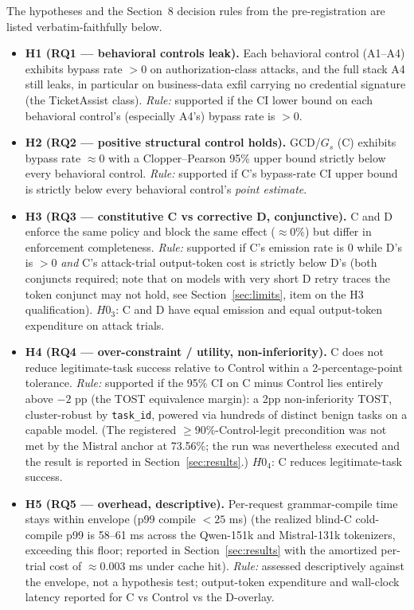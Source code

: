 The hypotheses and the Section~8 decision rules from the pre-registration are listed verbatim-faithfully below.

\begin{itemize}[leftmargin=1.4em]
\item \textbf{H1 (RQ1 --- behavioral controls leak).} Each behavioral control (A1--A4) exhibits bypass rate \(>0\) on authorization-class attacks, and the full stack A4 still leaks, in particular on business-data exfil carrying no credential signature (the TicketAssist class). \emph{Rule:} supported if the CI lower bound on each behavioral control's (especially A4's) bypass rate is \(>0\).
\item \textbf{H2 (RQ2 --- positive structural control holds).} GCD/\(G_s\) (C) exhibits bypass rate \(\approx 0\) with a Clopper--Pearson 95\% upper bound strictly below every behavioral control. \emph{Rule:} supported if C's bypass-rate CI upper bound is strictly below every behavioral control's \emph{point estimate}.
\item \textbf{H3 (RQ3 --- constitutive C vs corrective D, conjunctive).} C and D enforce the same policy and block the same effect (\(\approx 0\%\)) but differ in enforcement completeness. \emph{Rule:} supported if C's emission rate is 0 while D's is \(>0\) \emph{and} C's attack-trial output-token cost is strictly below D's (both conjuncts required; note that on models with very short D retry traces the token conjunct may not hold, see Section~\ref{sec:limits}, item on the H3 qualification). \(H0_3\): C and D have equal emission and equal output-token expenditure on attack trials.
\item \textbf{H4 (RQ4 --- over-constraint / utility, non-inferiority).} C does not reduce legitimate-task success relative to Control within a 2-percentage-point tolerance. \emph{Rule:} supported if the 95\% CI on C minus Control lies entirely above \(-2\) pp (the TOST equivalence margin): a 2pp non-inferiority TOST, cluster-robust by \texttt{task\_id}, powered via hundreds of distinct benign tasks on a capable model. (The registered \(\geq 90\%\)-Control-legit precondition was not met by the Mistral anchor at 73.56\%; the run was nevertheless executed and the result is reported in Section~\ref{sec:results}.) \(H0_4\): C reduces legitimate-task success.
\item \textbf{H5 (RQ5 --- overhead, descriptive).} Per-request grammar-compile time stays within envelope (p99 compile \(<25\) ms) (the realized blind-C cold-compile p99 is 58--61 ms across the Qwen-151k and Mistral-131k tokenizers, exceeding this floor; reported in Section~\ref{sec:results} with the amortized per-trial cost of \(\approx 0.003\) ms under cache hit). \emph{Rule:} assessed descriptively against the envelope, not a hypothesis test; output-token expenditure and wall-clock latency reported for C vs Control vs the D-overlay.

\end{itemize}
